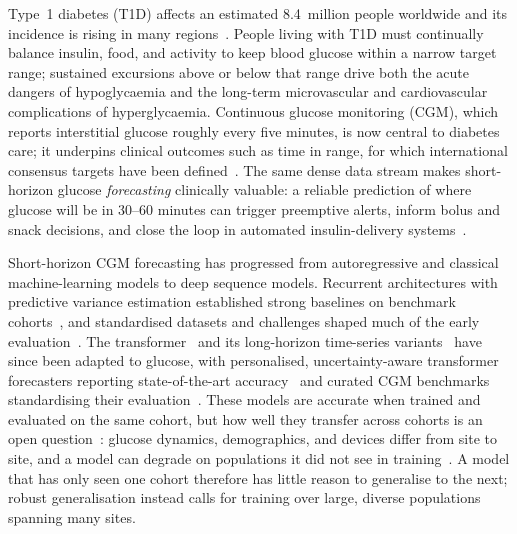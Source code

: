 \documentclass[10pt,letterpaper]{article}
\begin{document}
Type~1 diabetes (T1D) affects an estimated 8.4~million people worldwide and its
incidence is rising in many regions~\cite{idf2021,gregory2022t1dindex}. People living with T1D must
continually balance insulin, food, and activity to keep blood glucose within a
narrow target range; sustained excursions above or below that range drive both
the acute dangers of hypoglycaemia and the long-term microvascular and
cardiovascular complications of hyperglycaemia. Continuous glucose monitoring
(CGM), which reports interstitial glucose roughly every five minutes, is now
central to diabetes care; it underpins clinical outcomes such as time in range,
for which international consensus targets have been defined~\cite{battelino2019tir}. The same dense data stream makes
short-horizon glucose \emph{forecasting} clinically valuable: a reliable
prediction of where glucose will be in 30--60 minutes can trigger preemptive
alerts, inform bolus and snack decisions, and close the loop in automated
insulin-delivery systems~\cite{vettoretti2020advanced,bekiari2018ap}.

Short-horizon CGM forecasting has progressed from autoregressive and classical
machine-learning models to deep sequence models. Recurrent architectures with
predictive variance estimation established strong baselines on benchmark
cohorts~\cite{martinsson2020}, and standardised datasets and challenges shaped
much of the early evaluation~\cite{marling2020ohio}. The
transformer~\cite{vaswani2017attention} and its long-horizon time-series
variants~\cite{zhou2021informer,wu2021autoformer} have since been adapted to
glucose, with personalised, uncertainty-aware transformer forecasters reporting
state-of-the-art accuracy~\cite{sergazinov2023gluformer} and curated CGM
benchmarks standardising their evaluation~\cite{sergazinov2024glucobench}.
These models are accurate when trained and evaluated on the same cohort, but how
well they transfer across cohorts is an open question~\cite{ghimire2024generalize}:
glucose dynamics, demographics, and devices differ from site to site, and a model
can degrade on populations it did not see in training~\cite{farahmand2025glumind}.
A model that has only seen one cohort therefore has little reason to generalise to
the next; robust generalisation instead calls for training over large, diverse
populations spanning many sites.
\end{document}
